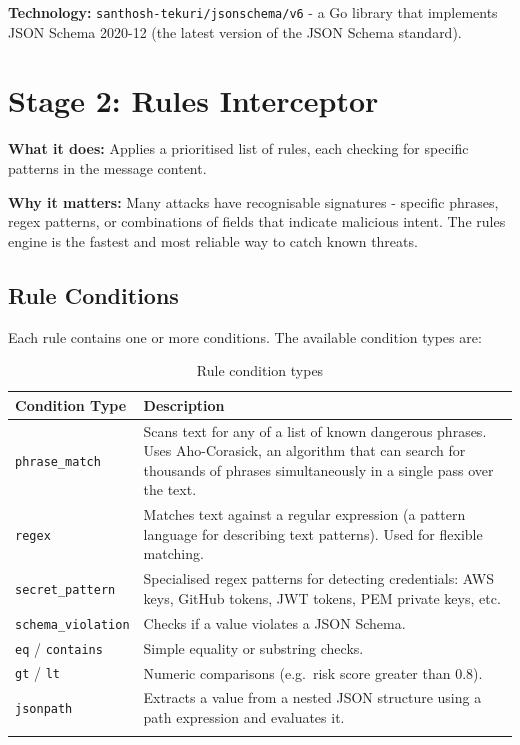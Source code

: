 \documentclass[12pt,a4paper]{report}
\begin{document}
\textbf{Technology:} \texttt{santhosh-tekuri/jsonschema/v6} - a Go library
that implements JSON Schema 2020-12 (the latest version of the JSON Schema standard).

\section{Stage 2: Rules Interceptor}

\textbf{What it does:} Applies a prioritised list of rules, each checking for
specific patterns in the message content.

\textbf{Why it matters:} Many attacks have recognisable signatures - specific
phrases, regex patterns, or combinations of fields that indicate malicious
intent. The rules engine is the fastest and most reliable way to catch known threats.

\subsection{Rule Conditions}

Each rule contains one or more conditions. The available condition types are:

\begin{longtable}{p{3.5cm} p{9cm}}
  \toprule
  \textbf{Condition Type} & \textbf{Description} \\
  \midrule
  \endhead
  \texttt{phrase\_match} & Scans text for any of a list of known dangerous
    phrases. Uses Aho-Corasick, an algorithm that can search for thousands of
    phrases simultaneously in a single pass over the text. \\[4pt]
  \texttt{regex} & Matches text against a regular expression (a pattern
    language for describing text patterns). Used for flexible matching. \\[4pt]
  \texttt{secret\_pattern} & Specialised regex patterns for detecting
    credentials: AWS keys, GitHub tokens, JWT tokens, PEM private keys, etc. \\[4pt]
  \texttt{schema\_violation} & Checks if a value violates a JSON Schema. \\[4pt]
  \texttt{eq} / \texttt{contains} & Simple equality or substring checks. \\[4pt]
  \texttt{gt} / \texttt{lt} & Numeric comparisons (e.g.\ risk score greater
    than 0.8). \\[4pt]
  \texttt{jsonpath} & Extracts a value from a nested JSON structure using a
    path expression and evaluates it. \\
  \bottomrule
  \caption{Rule condition types}
\end{longtable}
\end{document}
